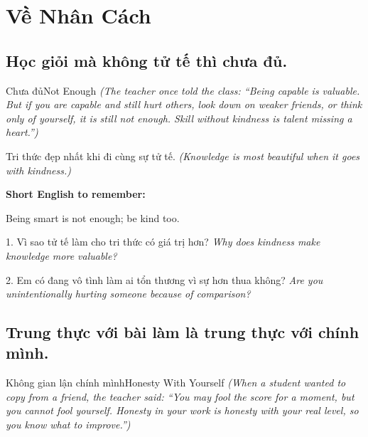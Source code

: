 \chapter{Về Nhân Cách}

\section{Học giỏi mà không tử tế thì chưa đủ.}
\begin{truyen}{Chưa đủ}{Not Enough}
\textit{(The teacher once told the class: ``Being capable is valuable. But if you are capable and still hurt others, look down on weaker friends, or think only of yourself, it is still not enough. Skill without kindness is talent missing a heart.'')}
\end{truyen}

\begin{baihoc}
Tri thức đẹp nhất khi đi cùng sự tử tế.
\textit{(Knowledge is most beautiful when it goes with kindness.)}
\end{baihoc}

\begin{ghinhoanh}
\textbf{Short English to remember:}

Being smart is not enough; be kind too.

\end{ghinhoanh}

\begin{tuhocnhanh}
1. Vì sao tử tế làm cho tri thức có giá trị hơn? \textit{Why does kindness make knowledge more valuable?}

2. Em có đang vô tình làm ai tổn thương vì sự hơn thua không? \textit{Are you unintentionally hurting someone because of comparison?}
\end{tuhocnhanh}
\ngancach

\section{Trung thực với bài làm là trung thực với chính mình.}
\begin{truyen}{Không gian lận chính mình}{Honesty With Yourself}
\textit{(When a student wanted to copy from a friend, the teacher said: ``You may fool the score for a moment, but you cannot fool yourself. Honesty in your work is honesty with your real level, so you know what to improve.'')}
\end{truyen}

